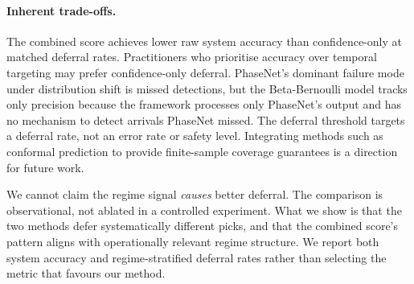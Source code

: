 \paragraph{Inherent trade-offs.} The combined score achieves lower raw system accuracy than confidence-only at matched deferral rates. Practitioners who prioritise accuracy over temporal targeting may prefer confidence-only deferral. PhaseNet's dominant failure mode under distribution shift is missed detections, but the Beta-Bernoulli model tracks only precision because the framework processes only PhaseNet's output and has no mechanism to detect arrivals PhaseNet missed. The deferral threshold targets a deferral rate, not an error rate or safety level. Integrating methods such as conformal prediction to provide finite-sample coverage guarantees is a direction for future work.

\medskip
We cannot claim the regime signal \emph{causes} better deferral. The comparison is observational, not ablated in a controlled experiment. What we show is that the two methods defer systematically different picks, and that the combined score's pattern aligns with operationally relevant regime structure. We report both system accuracy and regime-stratified deferral rates rather than selecting the metric that favours our method.
